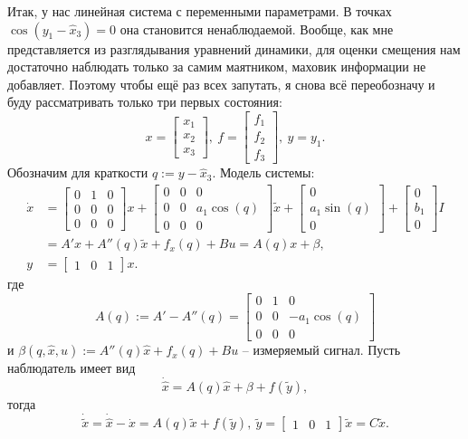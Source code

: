 \documentclass{article}
\begin{document}
Итак, у нас линейная система с переменными параметрами. В точках $\cos(y_1-\hat{x}_3) = 0$ она становится ненаблюдаемой. Вообще, как мне представляется из разглядывания уравнений динамики, для оценки смещения нам достаточно наблюдать только за самим маятником, маховик информации не добавляет. Поэтому чтобы ещё раз всех запутать, я снова всё переобозначу и буду рассматривать только три первых состояния:
\[
	x=\begin{bmatrix} x_1 \\ x_2 \\ x_3 \end{bmatrix}, \ f=\begin{bmatrix} f_1 \\ f_2 \\ f_3 \end{bmatrix},\  y=y_1.
\]
Обозначим для краткости $q:=y-\hat{x}_3$. Модель системы:
\[
	\begin{aligned}
		\dot{x} &= \begin{bmatrix} 0 & 1 & 0 \\ 0 & 0 & 0 \\ 0 & 0 & 0\end{bmatrix} x 
					+ \begin{bmatrix} 0 & 0 & 0 \\0 & 0 & a_1\cos(q) \\0 & 0 & 0\end{bmatrix} \tilde{x}
					+ \begin{bmatrix} 0 \\ a_1\sin(q) \\ 0\end{bmatrix} 
					+ \begin{bmatrix} 0 \\ b_1 \\ 0 \end{bmatrix}I \\
				&= A'x + A''(q)\tilde{x} + f_x(q) + Bu = A(q)x + \beta, \\
		y &= \begin{bmatrix} 1 & 0 & 1 \end{bmatrix}x.
	\end{aligned}
\]
где 
\[
	A(q) := A' - A''(q) = \begin{bmatrix} 0 & 1 &  0\\ 0 & 0 & -a_1\cos(q)\\ 0 & 0 & 0 \end{bmatrix}
\]
и $\beta(q,\hat{x},u) :=  A''(q)\hat{x} + f_x(q) + Bu$ -- измеряемый сигнал. Пусть наблюдатель имеет вид
\[
	\dot{\hat{x}} = A(q)\hat{x} + \beta + f(\tilde{y}),		
\]
тогда
\[
	\dot{\tilde{x}} = \dot{\hat{x}} - \dot{x} = A(q)\tilde{x} + f(\tilde{y}), \ \tilde{y} = \begin{bmatrix} 1 & 0 & 1 \end{bmatrix}\tilde{x} = C\tilde{x}.
\]
\end{document}
